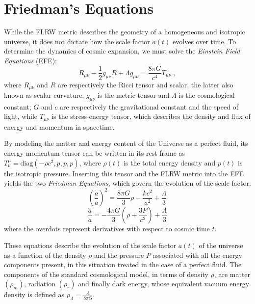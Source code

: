 \documentclass[12pt,a4paper,oneside]{report}
\begin{document}
\section{Friedman's Equations}\label{sec:Friedman's_Equations}
While the FLRW metric describes the geometry of a homogeneous and isotropic universe, it does not dictate how the scale factor $a(t)$ evolves over time. To determine the dynamics of cosmic expansion, we must solve the \textit{Einstein Field Equations} (EFE):
\begin{equation}
  R_{\mu \nu} - \frac{1}{2}g_{\mu \nu}R + \Lambda g_{\mu \nu} = \frac{8 \pi G}{c^4} T_{\mu \nu} \; ,
  \label{eq:EFE}
\end{equation}
where $R_{\mu \nu}$ and $R$ are respectively the Ricci tensor and scalar, the latter also known as scalar curvature, $g_{\mu \nu}$ is the metric tensor and $\Lambda$ is the cosmological constant; $G$ and $c$ are respectively the gravitational constant and the speed of light, while $T_{\mu \nu}$ is the stress-energy tensor, which describes the density and flux of energy and momentum in spacetime.

By modeling the matter and energy content of the Universe as a perfect fluid, its energy-momentum tensor can be written in its rest frame as $T^\mu_\nu = \text{diag}(-\rho c^2, p, p, p)$, where $\rho(t)$ is the total energy density and $p(t)$ is the isotropic pressure. Inserting this tensor and the FLRW metric into the EFE yields the two \textit{Friedman Equations}, which govern the evolution of the scale factor:
\begin{equation}
  \left(\frac{\dot{a}}{a}\right)^2 = \frac{8 \pi G}{3}\rho - \frac{k c^2}{a^2} + \frac{\Lambda}{3}
  \label{eq:Friedmann_I}
\end{equation}
\begin{equation}
  \frac{\ddot{a}}{a} = -\frac{4 \pi G}{3} \left( \rho + \frac{3P}{c^2} \right) + \frac{\Lambda}{3}
  \label{eq:Friedmann_II}
\end{equation}
where the overdots represent derivatives with respect to cosmic time $t$.

These equations describe the evolution of the scale factor $a(t)$ of the universe as a function of the density $\rho$ and the pressure $P$ associated with all the energy components present, in this situation treated in the case of a perfect fluid. The components of the standard cosmological model, in terms of density $\rho$, are matter $(\rho_m)$, radiation $(\rho_r)$ and finally dark energy, whose equivalent vacuum energy density is defined as $\rho_\Lambda = \frac{\Lambda}{8 \pi G}$.
\end{document}
